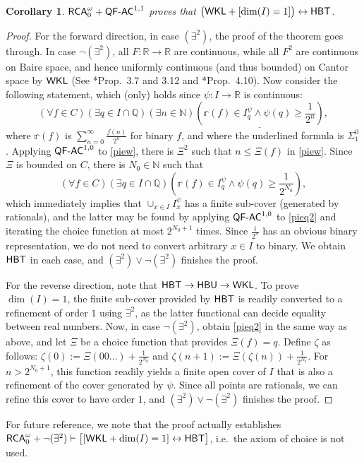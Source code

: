 \documentclass[reqno]{amsart}
\newtheorem{cor}[thm]{Corollary}
\newcommand\be{\begin{equation}}
\newcommand\ee{\end{equation}}
\def\r{\mathbb{r}}
\def\RCA{\textup{\textsf{RCA}}}
\def\RCAo{\textup{\textsf{RCA}}_{0}^{\omega}}
\def\WKL{\textup{\textsf{WKL}}}
\def\N{{\mathbb  N}}
\def\Q{{\mathbb  Q}}
\def\R{{\mathbb  R}}
\def\di{\rightarrow}
\def\asa{\leftrightarrow}
\def\QFAC{\textup{\textsf{QF-AC}}}
\def\HBU{\textup{\textsf{HBU}}}
\def\HBT{\textup{\textsf{HBT}}}
\def\ECF{\textup{\textsf{ECF}}}
\numberwithin{equation}{section}
\numberwithin{thm}{section}
\begin{document}
\begin{cor}\label{dorkeeee}
$\RCAo+\QFAC^{1,1}$ proves that $\big(\WKL+ [\dim(I)=1]\big)\asa \HBT$.
\end{cor}
\begin{proof}
For the forward direction, in case $(\exists^{2})$, the proof of the theorem goes through.  In case $\neg(\exists^{2})$, all $F:\R\di \R$ are continuous, while all $F^{2}$ are continuous on Baire space, and hence uniformly continuous (and thus bounded) on Cantor space by $\WKL$ (See \cite{kohlenbach2}*{Prop.\ 3.7 and 3.12} and \cite{kohlenbach4}*{Prop.~4.10}).  Now consider the following statement, which (only) holds since $\psi:I\di \R$ is continuous:
\be\label{piew}\textstyle
(\forall f\in C)(\exists q\in I\cap \Q)(\exists n\in \N)\underline{(\r(f)\in I_{q}^{\psi}\wedge \psi(q)\geq \frac{1}{2^{n}})}, 
\ee
where $\r(f)$ is $\sum_{n=0}^{\infty}\frac{f(n)}{2^{n}}$ for binary $f$, and where the underlined formula is $\Sigma^{0}_{1}$.  
Applying $\QFAC^{1,0}$ to \eqref{piew}, there is $\Xi^{2}$ such that $n\leq \Xi(f)$ in \eqref{piew}.  Since $\Xi$ is bounded on $C$, there is $N_{0}\in \N$ such that
\be\label{pieq2}\textstyle
(\forall f\in C)(\exists q\in I\cap \Q){(\r(f)\in I_{q}^{\psi}\wedge \psi(q)\geq \frac{1}{2^{N_{0}}})}, 
\ee
which immediately implies that $\cup_{x\in I}I_{x}^{\psi}$ has a finite sub-cover (generated by rationals), and the latter may be found by applying $\QFAC^{1,0}$ to \eqref{pieq2} and iterating the choice function at most $2^{N_{0}+1}$ times. 
Since $\frac{i}{2^{n}}$ has an obvious binary representation, we do not need to convert arbitrary $x\in I$ to binary.  
We obtain $\HBT$ in each case, and $(\exists^{2})\vee \neg(\exists^{2})$ finishes the proof. 

\smallskip

For the reverse direction, note that $\HBT\di \HBU\di \WKL$.  To prove $\dim(I)=1$, the finite sub-cover provided by $\HBT$ is readily converted to a refinement of order $1$ using $\exists^{2}$, as the latter functional can decide equality between real numbers.  
Now, in case $\neg(\exists^{2})$, obtain \eqref{pieq2} in the same way as above, and let $\Xi$ be a choice function that provides $\Xi(f)=q$.  
Define $\zeta$ as follows: $\zeta(0):=\Xi(00\dots)+\frac{1}{2^{N_{0}}} $ and $\zeta(n+1):= \Xi(\zeta(n))+\frac{1}{2^{N_{0}}}$.  
For $n> 2^{N_{0}+1}$, this function readily yields a finite open cover of $I$ that is also a refinement of the cover generated by $\psi$. 
Since all points are rationals, we can refine this cover to have order $1$, and $(\exists^{2})\vee \neg(\exists^{2})$ finishes the proof. 
\end{proof}
For future reference, we note that the proof actually establishes $\RCAo+\neg(\exists^{2})\vdash \big[[\WKL+\dim(I)=1]\asa \HBT\big]$, i.e.\ the axiom of choice is not used. 
\end{document}
